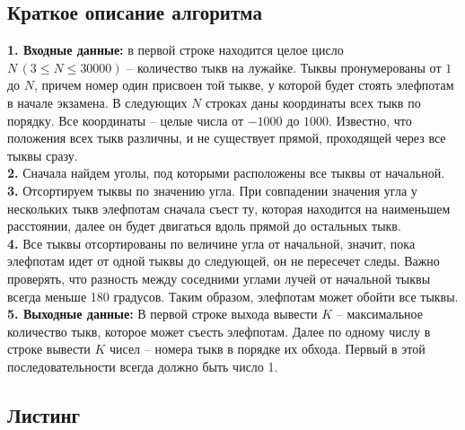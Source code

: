 \documentclass[a5paper, 10pt]{article}
\theoremstyle{definition}
\theoremstyle{plain}
\theoremstyle{remark}
\begin{document}
\subsection{Краткое описание алгоритма}
\textbf{1. Входные данные:} в первой строке находится целое цисло $N \, (3 \leq N \leq 30000)$ -- количество тыкв на лужайке. Тыквы пронумерованы от $1$ до $N$, причем номер один присвоен той тыкве, у которой будет стоять элефпотам в начале экзамена. В следующих $N$ строках даны координаты всех тыкв по порядку. Все координаты -- целые числа от $-1000$ до $1000$. Известно, что положения всех тыкв различны, и не существует прямой, проходящей через все тыквы сразу.\\
\textbf{2.} Сначала найдем уголы, под которыми расположены все тыквы от начальной. \\
\textbf{3.} Отсортируем тыквы по значению угла. При совпадении значения угла у нескольких тыкв элефпотам сначала съест ту, которая находится на наименьшем расстоянии, далее он будет двигаться вдоль прямой до остальных тыкв.\\
\textbf{4.} Все тыквы отсортированы по величине угла от начальной, значит, пока элефпотам идет от одной тыквы до следующей, он не пересечет следы. Важно проверять, что разность между соседними углами лучей от начальной тыквы всегда меньше 180 градусов. Таким образом, элефпотам может обойти все тыквы.\\
\textbf{5. Выходные данные:} В первой строке выхода вывести $K$ -- максимальное количество тыкв, которое может съесть элефпотам. Далее по одному числу в строке вывести $K$ чисел -- номера тыкв в порядке их обхода. Первый в этой последовательности всегда должно быть число 1.

\subsection{Листинг}
\end{document}
